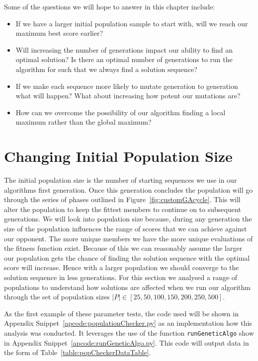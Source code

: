 Some of the questions we will hope to answer in this chapter include:
\begin{itemize}
    \item If we have a larger initial population sample to start with, will we reach our maximum best score earlier?
    \item Will increasing the number of generations impact our ability to find an optimal solution? Is there an optimal number of generations to run the algorithm for such that we always find a solution sequence?
    \item If we make each sequence more likely to mutate generation to generation what will happen?
    What about increasing how potent our mutations are?
    \item How can we overcome the possibility of our algorithm finding a local maximum rather than the global maximum?
\end{itemize}

\section{Changing Initial Population Size}\label{sec:ChangingInitialPopulationSize}
The initial population size is the number of starting sequences we use in our algorithms first generation.
Once this generation concludes the population will go through the series of phases outlined in Figure~\ref{fig:customGAcycle}.
This will alter the population to keep the fittest members to continue on to subsequent generations.
We will look into population size because, during any generation the size of the population influences the range of scores that we can achieve against our opponent.
The more unique members we have the more unique evaluations of the fitness function exist.
Because of this we can reasonably assume the larger our population gets the chance of finding the solution sequence with the optimal score will increase.
Hence with a larger population we should converge to the solution sequence in less generations.
For this section we analysed a range of populations to understand how solutions are affected when we run our algorithm through the set of population sizes \(|P| \in [25,50,100,150,200,250,500]\).

As the first example of these parameter tests, the code used will be shown in Appendix Snippet~\ref{apcode:populationChecker.py} as an implementation how this analysis was conducted.
It leverages the use of the function \texttt{runGeneticAlgo} show in Appendix Snippet~\ref{apcode:runGeneticAlgo.py}.
This code will output data in the form of Table~\ref{table:popCheckerDataTable}.

